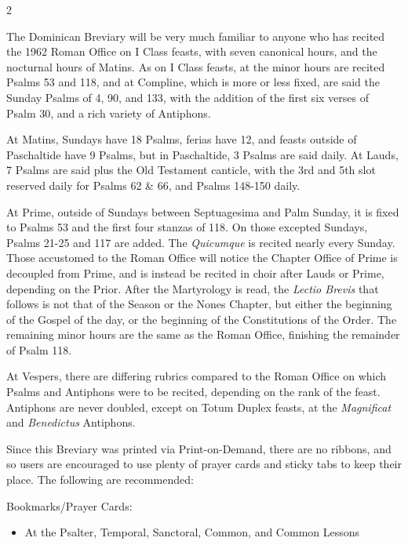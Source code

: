 \begin{multicols}{2}
{\color{Red} }

The Dominican Breviary will be very much familiar to anyone who has recited the 1962 Roman Office on I Class feasts, with seven canonical hours, and the nocturnal hours of Matins. As on I Class feasts, at the minor hours are recited Psalms 53 and 118, and at Compline, which is more or less fixed, are said the Sunday Psalms of 4, 90, and 133, with the addition of the first six verses of Psalm 30, and a rich variety of Antiphons.

At Matins, Sundays have 18 Psalms, ferias have 12, and feasts outside of Paschaltide have 9 Psalms, but in Paschaltide, 3 Psalms are said daily. At Lauds, 7 Psalms are said plus the Old Testament canticle, with the 3rd and 5th slot reserved daily for Psalms 62 \& 66, and Psalms 148-150 daily.

At Prime, outside of Sundays between Septuagesima and Palm Sunday, it is fixed to Psalms 53 and the first four stanzas of 118. On those excepted Sundays, Psalms 21-25 and 117 are added. The \emph{Quicumque} is recited nearly every Sunday. Those accustomed to the Roman Office will notice the Chapter Office of Prime is decoupled from Prime, and is instead be recited in choir after Lauds or Prime, depending on the Prior. After the Martyrology is read, the \emph{Lectio Brevis} that follows is not that of the Season or the Nones Chapter, but either the beginning of the Gospel of the day, or the beginning of the Constitutions of the Order. The remaining minor hours are the same as the Roman Office, finishing the remainder of Psalm 118.

At Vespers, there are differing rubrics compared to the Roman Office on which Psalms and Antiphons were to be recited, depending on the rank of the feast. Antiphons are never doubled, except on Totum Duplex feasts, at the \emph{Magnificat} and \emph{Benedictus} Antiphons.


{\color{Red} }
Since this Breviary was printed via Print-on-Demand, there are no ribbons, and so users are encouraged to use plenty of prayer cards and sticky tabs to keep their place. The following are recommended:

\noindent Bookmarks/Prayer Cards:
\begin{itemize}[nosep,leftmargin=8pt]
	\item At the Psalter, Temporal, Sanctoral, Common, and Common Lessons
\end{itemize}



\end{multicols}
